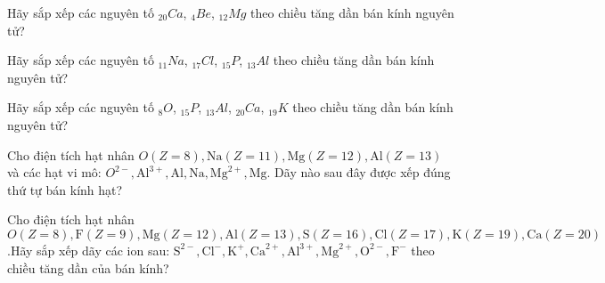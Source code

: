 \begin{vd}
	Hãy sắp xếp các nguyên tố $_{20}Ca$, $_{4}Be$, $_{12}Mg$ theo chiều tăng dần bán kính nguyên tử?
\end{vd}
\begin{vd}
	Hãy sắp xếp các nguyên tố $_{11}Na$, $_{17}Cl$, $_{15}P$, $_{13}Al$ theo chiều tăng dần bán kính nguyên tử?
	\sodongkevd[10]
\end{vd}
\begin{vd}
	Hãy sắp xếp các nguyên tố $_{8}O$, $_{15}P$, $_{13}Al$, $_{20}Ca$, $_{19}K$ theo chiều tăng dần bán kính nguyên tử?
	\sodongkevd[10]
\end{vd}
\begin{vd}
	Cho điện tích hạt nhân $O(Z=8), \mathrm{Na}(Z=11), \mathrm{Mg}(Z=12), \mathrm{Al}(Z=13)$ và các hạt vi mô: $O^{2-}, \mathrm{Al}^{3+}, \mathrm{Al}, \mathrm{Na}, \mathrm{Mg}^{2+}, \mathrm{Mg}$. Dãy nào sau đây được xếp đúng thứ tự bán kính hạt?
	\sodongkevd[15]
\end{vd}
\begin{vd}
	Cho điện tích hạt nhân $O(Z=8), \mathrm{F}(Z=9), \mathrm{Mg}(Z=12), \mathrm{Al}(Z=13),\mathrm{S}(Z=16),\mathrm{Cl}(Z=17),\mathrm{K}(Z=19),\mathrm{Ca}(Z=20)$.Hãy sắp xếp dãy các ion sau: $\mathrm{S}^{2-},\mathrm{Cl}^{-},\mathrm{K}^{+},\mathrm{Ca}^{2+},\mathrm{Al}^{3+},\mathrm{Mg}^{2+},\mathrm{O}^{2-},\mathrm{F}^{-} $ theo chiều tăng dần của bán kính?
	\sodongkevd[15]
\end{vd}







